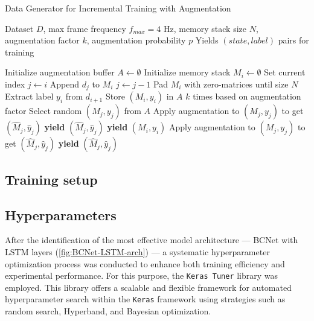 \begin{algorithm}[H]
  \caption{Data Generator for Incremental Training with Augmentation}
  \begin{algorithmic}[1]
    \Require Dataset $D$, max frame frequency $f_{max} = 4$ Hz, memory stack size $N$, augmentation factor $k$, augmentation probability $p$
    \Ensure Yields $(state, label)$ pairs for training

    \State Initialize augmentation buffer $A \gets \emptyset$
    \State Initialize memory stack $M_i \gets \emptyset$
    \State Set current index $j \gets i$
    \State Append $d_j$ to $M_i$
    \EndIf
    \State $j \gets j - 1$
    \EndWhile
    \State Pad $M_i$ with zero-matrices until size $N$
    \EndIf
    \State Extract label $y_i$ from $d_{i+1}$
    \State Store $(M_i, y_i)$ in $A$ $k$ times based on augmentation factor
    \State Select random $(M_j, y_j)$ from $A$
    \State Apply augmentation to $(M_j, y_j)$ to get $(\hat{M}_j, \hat{y}_j)$
    \State \textbf{yield} $(\hat{M}_j, \hat{y}_j)$
    \EndIf
    \State \textbf{yield} $(M_i, y_i)$
    \EndFor
    \State Apply augmentation to $(M_j, y_j)$ to get $(\hat{M}_j, \hat{y}_j)$
    \State \textbf{yield} $(\hat{M}_j, \hat{y}_j)$
    \EndFor
    \EndIf
  \end{algorithmic}
  \label{alg:data_generator}
\end{algorithm}

\subsection{Training setup}

\subsection{Hyperparameters}
\label{sec:hyperparameters}

After the identification of the most effective model architecture --- BCNet with LSTM layers (\autoref{fig:BCNet-LSTM-arch}) --- a systematic hyperparameter optimization process was conducted to enhance both training efficiency and experimental performance. For this purpose, the \texttt{Keras Tuner} library was employed. This library offers a scalable and flexible framework for automated hyperparameter search within the \texttt{Keras} framework using strategies such as random search, Hyperband, and Bayesian optimization.

